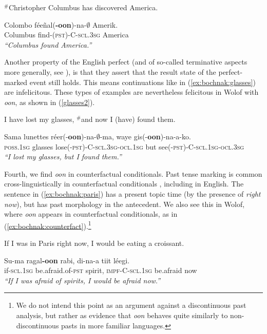 \documentclass[output=paper,newtxmath,modfonts,nonflat,draftmode]{langsci/langscibook}
\begin{document}
\ea\label{columbus2}
$^{\#}$Christopher Columbus has discovered America.
\z

\ea\label{ex:bochnak:columbus}
\gll Colombo f\'ee\~nal(\textbf{-oon})-na-$\emptyset$ Amerik.\\
Columbus find-(\textsc{pst)-C-scl.3sg} America\\
\glt \textit{``Columbus found America.''}
\z

Another property of the English perfect (and of so-called terminative aspects more generally, see \citealt{bohnemeyer02grammar}), is that they assert that the result state of the perfect-marked event still holds. This means continuations like in (\ref{ex:bochnak:glasses}) are infelicitous. These types of examples are nevertheless felicitous in Wolof with \textit{oon}, as shown in (\ref{glasses2}).

\ea\label{ex:bochnak:glasses} 
I have lost my glasses, $^{\#}$and now I (have) found them. 
\z

\ea\label{glasses2}
\gll Sama lunettes r\'eer(-\textbf{oon})-na-$\emptyset$-ma, waye gis(-\textbf{oon})-na-a-ko. \\
\textsc{poss.1sg} glasses lose\textsc{(-pst)-C-scl.3sg-ocl.1sg} but see\textsc{(-pst)-C-scl.1sg-ocl.3sg} \\
\glt \textit{``I lost my glasses, but I found them.''} 
\z

Fourth, we find \textit{oon} in counterfactual conditionals. Past tense marking is common cross-linguistically in counterfactual conditionals \citep{iatridou00grammatical, halpert12aspect}, including in English. The sentence in (\ref{ex:bochnak:paris}) has a present topic time (by the presence of \textit{right now}), but has past morphology in the antecedent. We also see this in Wolof, where \textit{oon} appears in counterfactual conditionals, as in (\ref{ex:bochnak:counterfact}).\footnote{We do not intend this point as an argument against a discontinuous past analysis, but rather as evidence that \textit{oon} behaves quite similarly to non-discontinuous pasts in more familiar languages.}  

\ea\label{ex:bochnak:paris} 
If I was in Paris right now, I would be eating a croissant. 
\z

\ea\label{ex:bochnak:counterfact}
\gll Su-ma ragal\textbf{-oon} rabi, di-na-a tiit l\'eegi.\\
if-\textsc{scl.1sg} be.afraid.of-\textsc{pst} spirit,
\textsc{impf-C-scl.1sg} be.afraid now\\
\glt \textit{``If I was afraid of spirits, I would be afraid now.''}
\z
\end{document}
